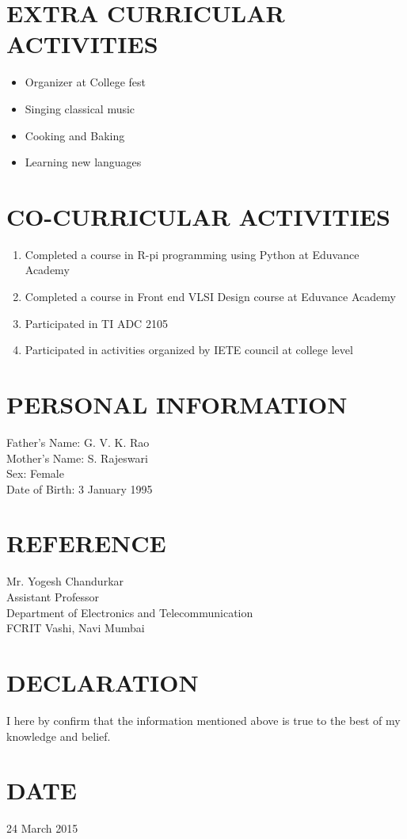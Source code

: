 \documentclass[line, margin]{res}
\begin{document}
\begin{resume}
\section{\bf EXTRA CURRICULAR ACTIVITIES}
\begin{itemize}
	\item Organizer at College fest  
	\item Singing classical music
	\item Cooking and Baking
	\item Learning new languages
\end{itemize}

\section{\bf CO-CURRICULAR ACTIVITIES}
\begin{enumerate}
	\item Completed a course in R-pi programming using Python at Eduvance Academy
	\item Completed a course in Front end VLSI Design course at Eduvance Academy
	\item Participated in TI ADC 2105
	\item Participated in activities organized by IETE council at college level
\end{enumerate}

\section{\bf PERSONAL INFORMATION}
Father's Name: G. V. K. Rao \\
Mother's Name: S. Rajeswari \\
Sex: Female \\
Date  of Birth: 3 January 1995 \\

\section{\bf REFERENCE}
Mr. Yogesh Chandurkar \\
Assistant Professor \\
Department of Electronics and Telecommunication \\
FCRIT Vashi, Navi Mumbai \\

\section{\bf DECLARATION}
I here by confirm that the information mentioned above is true to the best of my knowledge and belief.

\section{\bf DATE}
24 March 2015

\end{resume}
\end{document}
